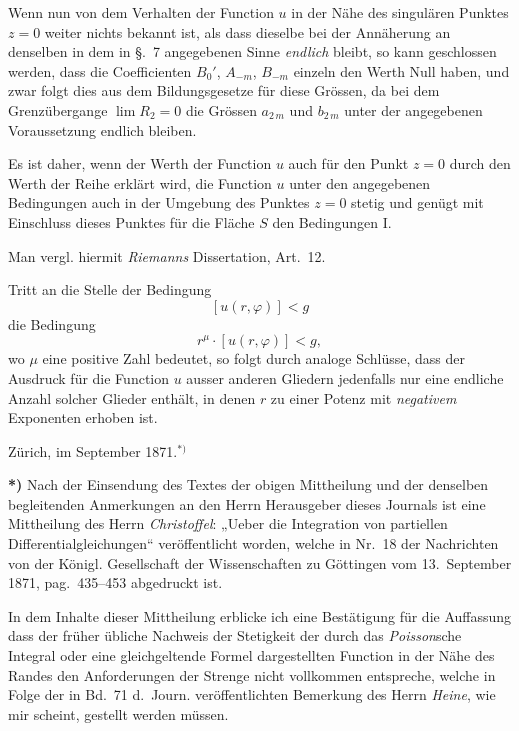 \documentclass{article}
\begin{document}
Wenn nun von dem Verhalten der Function $u$ in der Nähe des singulären Punktes $z = 0$ weiter nichts bekannt ist, als dass dieselbe bei der Annäherung an denselben in dem in §.~7 angegebenen Sinne \emph{endlich} bleibt, so kann geschlossen werden, dass die Coefficienten $B_0'$, $A_{-m}$, $B_{-m}$ einzeln den Werth Null haben, und zwar folgt dies aus dem Bildungsgesetze für diese Grössen, da bei dem Grenzübergange $\lim R_2 = 0$ die Grössen $a_{2\,m}$ und $b_{2\,m}$ unter der angegebenen Voraussetzung endlich bleiben.

Es ist daher, wenn der Werth der Function $u$ auch für den Punkt $z = 0$ durch den Werth der Reihe erklärt wird, die Function $u$ unter den angegebenen Bedingungen auch in der Umgebung des Punktes $z = 0$ stetig und genügt mit Einschluss dieses Punktes für die Fläche $S$ den Bedingungen I.

Man vergl. hiermit \emph{Riemanns} Dissertation, Art.~12.

Tritt an die Stelle der Bedingung
\[
[u(r, \varphi)] < g
\]
die Bedingung
\[
r^\mu \cdot [u(r, \varphi)] < g,
\]
wo $\mu$ eine positive Zahl bedeutet, so folgt durch analoge Schlüsse, dass der Ausdruck für die Function $u$ ausser anderen Gliedern jedenfalls nur eine endliche Anzahl solcher Glieder enthält, in denen $r$ zu einer Potenz mit \emph{negativem} Exponenten erhoben ist.

Zürich, im September 1871.${}^{*)}$

\textbf{*)} Nach der Einsendung des Textes der obigen Mittheilung und der denselben begleitenden Anmerkungen an den Herrn Herausgeber dieses Journals ist eine Mittheilung des Herrn \emph{Christoffel}: „Ueber die Integration von partiellen Differentialgleichungen“ veröffentlicht worden, welche in Nr.~18 der Nachrichten von der Königl. Gesellschaft der Wissenschaften zu Göttingen vom 13.~September 1871, pag.~435--453 abgedruckt ist.

In dem Inhalte dieser Mittheilung erblicke ich eine Bestätigung für die Auffassung dass der früher übliche Nachweis der Stetigkeit der durch das \emph{Poisson}sche Integral oder eine gleichgeltende Formel dargestellten Function in der Nähe des Randes den Anforderungen der Strenge nicht vollkommen entspreche, welche in Folge der in Bd.~71 d.~Journ. veröffentlichten Bemerkung des Herrn \emph{Heine}, wie mir scheint, gestellt werden müssen.
\end{document}
